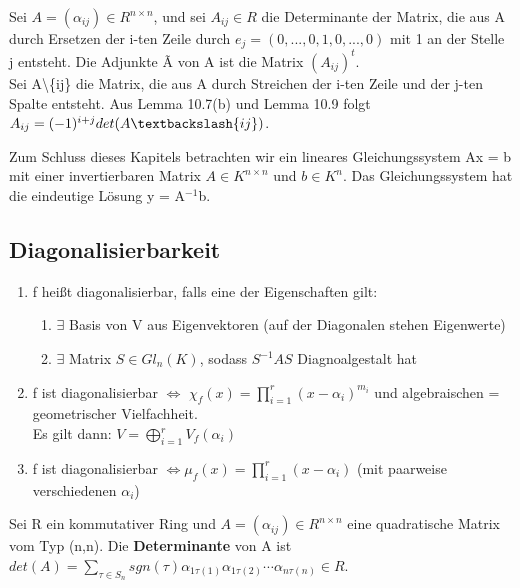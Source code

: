 \begin{definition}
Sei $A = (\alpha_{ij}) \in R^{n \times n}$, und sei $A_{ij} \in R$ die Determinante der Matrix, die aus A durch Ersetzen der i-ten Zeile durch $e_j = (0,...,0,1,0,...,0)$ mit 1 an der Stelle j entsteht. Die Adjunkte \~{A} von A ist die Matrix $(A_{ij})^t$.\\
Sei A\textbackslash\{ij\} die Matrix, die aus A durch Streichen der i-ten Zeile und der j-ten Spalte entsteht. Aus Lemma 10.7(b) und Lemma 10.9 folgt $A_{ij} =(-1)^{i+j} det(A\textbackslash\{ij\})$.
\end{definition}

Zum Schluss dieses Kapitels betrachten wir ein lineares Gleichungssystem Ax = b mit einer invertierbaren Matrix $A \in K^{n \times n}$ und $b \in K^n$. Das Gleichungssystem hat die eindeutige Lösung y = A$^{-1}$b.

\subsection{Diagonalisierbarkeit}

\begin{theorem}
\leavevmode
\begin{enumerate}
	\item f heißt diagonalisierbar, falls eine der Eigenschaften gilt:
	\begin{enumerate}
		\item $\exists$ Basis von V aus Eigenvektoren (auf der Diagonalen stehen Eigenwerte)
		\item $\exists$ Matrix $S \in Gl_n(K)$, sodass $S^{-1}AS$ Diagnoalgestalt hat
	\end{enumerate}
	\item f ist diagonalisierbar $\Leftrightarrow$ $\chi_f(x) = \prod \limits_{i=1}^{r} (x- \alpha_i)^{m_i}$ und algebraischen = geometrischer Vielfachheit.\\Es gilt dann: $V=\bigoplus \limits_{i=1}^r V_f(\alpha_i)$
	\item f ist diagonalisierbar $\Leftrightarrow \mu_f(x) = \prod \limits_{i=1}^{r}(x-\alpha_i)$ (mit paarweise verschiedenen $\alpha_i$) 
\end{enumerate}
\end{theorem}



\begin{definition}
Sei R ein kommutativer Ring und $A = (\alpha_{ij}) \in R^{n \times n}$ eine quadratische Matrix vom Typ (n,n). Die \textbf{Determinante} von A ist $det(A) = \sum\nolimits_{\tau \in S_n} sgn(\tau) \alpha_{1\tau(1)} \alpha_{1 \tau(2)} \cdots \alpha_{n \tau(n)} \in R$.
\end{definition}

